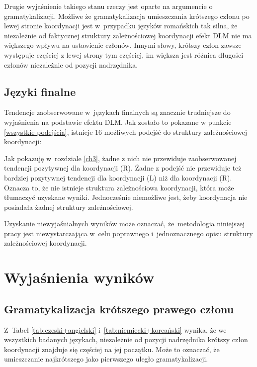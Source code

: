Drugie wyjaśnienie takiego stanu rzeczy jest oparte na argumencie o gramatykalizacji. Możliwe że gramatykalizacja umieszczania krótszego członu po lewej stronie koordynacji jest w~przypadku języków romańskich tak silna, że niezależnie od faktycznej struktury zależnościowej koordynacji efekt DLM nie ma większego wpływu na ustawienie członów. Innymi słowy, krótszy człon zawsze występuje częściej z lewej strony tym częściej, im większa jest różnica długości członów niezależnie od pozycji nadrzędnika.

\subsection{Języki finalne}

Tendencje zaobserwowane w~językach finalnych są znacznie trudniejsze do wyjaśnienia na podstawie efektu DLM. Jak zostało to pokazane w punkcie \ref{wszystkie-podejścia}, istnieje 16 możliwych podejść do struktury zależnościowej koordynacji:



Jak pokazuję w~rozdziale \ref{ch3}, żadne z nich nie przewiduje zaobserwowanej tendencji pozytywnej dla koordynacji (R). Żadne z podejść nie przewiduje też bardziej pozytywnej tendencji dla koordynacji (L) niż dla koordynacji (R). Oznacza to, że nie istnieje struktura zależnościowa koordynacji, która może tłumaczyć uzyskane wyniki. Jednocześnie niemożliwe jest, żeby koordynacja nie posiadała żadnej struktury zależnościowej. 

Uzyskanie niewyjaśnialnych wyników może oznaczać, że~metodologia niniejszej pracy jest niewystarczająca w~celu poprawnego i~jednoznacznego opisu struktury zależnościowej koordynacji.

\section{Wyjaśnienia wyników}

\subsection{Gramatykalizacja krótszego prawego członu} \label{gramatykalizacja}

Z~Tabel \ref{tab:czeski+angielski} i~\ref{tab:niemiecki+koreański} wynika, że we wszystkich badanych językach, niezależnie od pozycji nadrzędnika krótszy człon koordynacji znajduje się częściej na jej początku. Może to oznaczać, że umieszczanie najkrótszego jako pierwszego uległo gramatykalizacji.

